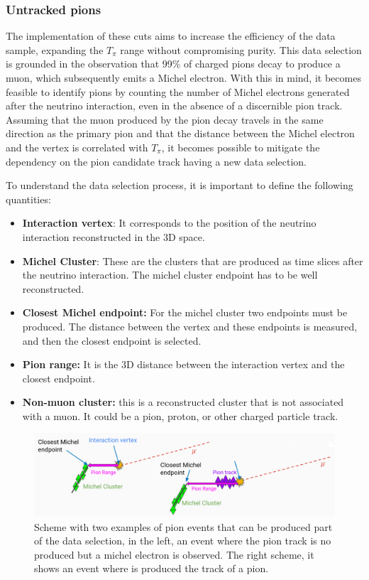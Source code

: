 \subsubsection{Untracked pions}
\label{Cap:Analysis:DataSelection:Cuts:UntrackedPions}
The implementation of these cuts aims to increase the efficiency of the data sample, expanding the $T_\pi$ range without compromising purity. This data selection is grounded in the observation that 99\% of charged pions decay to produce a muon, which subsequently emits a Michel electron. With this in mind, it becomes feasible to identify pions by counting the number of Michel electrons generated after the neutrino interaction, even in the absence of a discernible pion track. Assuming that the muon produced by the pion decay travels in the same direction as the primary pion and that the distance between the Michel electron and the vertex is correlated with $T_\pi$, it becomes possible to mitigate the dependency on the pion candidate track having a new data selection. 

To understand the data selection process, it is important to define the following quantities:
\begin{itemize}
    \item \textbf{Interaction vertex}: It corresponds to the position of the neutrino interaction reconstructed in the 3D space. 
    \item \textbf{Michel Cluster}: These are the clusters that are produced as time slices after the neutrino interaction. The michel cluster endpoint has to be well reconstructed. 
    \item \textbf{Closest Michel endpoint:} For the michel cluster two endpoints must be produced. The distance between the vertex and these endpoints is measured, and then the closest endpoint is selected.
    \item \textbf{Pion range:} It is the 3D distance between the interaction vertex and the closest endpoint.
    \item \textbf{Non-muon cluster:} this is a reconstructed cluster that is not associated with a muon. It could be a pion, proton, or other charged particle track. 
\end{itemize}
\begin{figure}
    \centering
    \includegraphics[scale=0.33]{Figures/Chapter4/DataSelection/TracklessPions.png}
    \caption{Scheme with two examples of pion events that can be produced part of the data selection, in the left, an event where the pion track is no produced but a michel electron is observed. The right scheme, it shows an event where is produced the track of a pion. }
    \label{fig:Analysis:Cuts:Untracked:MichelEventSheme}
\end{figure}

